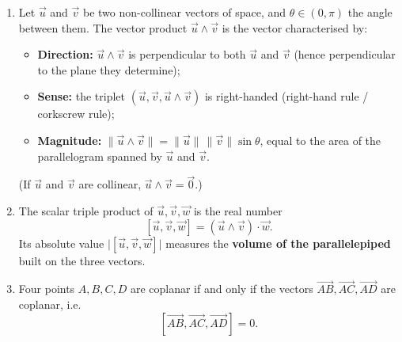 \documentclass[11pt]{article}
\newcommand{\cle}[1]{{\popxbold\color{popdark}#1}}
\begin{document}
\begin{corrige}
\begin{enumerate}
\item Let $\vec{u}$ and $\vec{v}$ be two non-collinear vectors of space, and $\theta \in (0, \pi)$ the angle between them. The \cle{vector product} $\vec{u} \wedge \vec{v}$ is the vector characterised by:
\begin{itemize}
\item \textbf{Direction:} $\vec{u} \wedge \vec{v}$ is perpendicular to both $\vec{u}$ and $\vec{v}$ (hence perpendicular to the plane they determine);
\item \textbf{Sense:} the triplet $(\vec{u}, \vec{v}, \vec{u} \wedge \vec{v})$ is right-handed (right-hand rule / corkscrew rule);
\item \textbf{Magnitude:} $\|\vec{u} \wedge \vec{v}\| = \|\vec{u}\|\,\|\vec{v}\|\sin\theta$, equal to the area of the parallelogram spanned by $\vec{u}$ and $\vec{v}$.
\end{itemize}
(If $\vec{u}$ and $\vec{v}$ are collinear, $\vec{u} \wedge \vec{v} = \vec{0}$.)
\item The \cle{scalar triple product} of $\vec{u}, \vec{v}, \vec{w}$ is the real number
\[
[\vec{u}, \vec{v}, \vec{w}] = (\vec{u} \wedge \vec{v}) \cdot \vec{w}.
\]
Its absolute value $\bigl|[\vec{u}, \vec{v}, \vec{w}]\bigr|$ measures the \textbf{volume of the parallelepiped} built on the three vectors.
\item Four points $A, B, C, D$ are coplanar if and only if the vectors $\vec{AB}, \vec{AC}, \vec{AD}$ are coplanar, i.e.
\[
[\vec{AB}, \vec{AC}, \vec{AD}] = 0.
\]
\end{enumerate}
\end{corrige}
\end{document}
